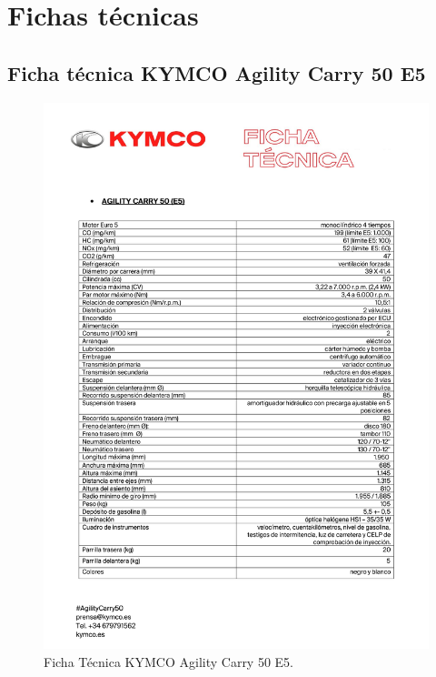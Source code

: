 \section{Fichas técnicas}
\label{anexo:ficha tecnica}

\subsection{Ficha técnica KYMCO Agility Carry 50 E5}
\label{subanexo: ficha tecnica kymco 50}

\begin{figure}[H]
    \centering
    \includegraphics[scale = 0.7]{archivos/ficha_tecnica_motillo_peter.pdf}
    \caption{Ficha Técnica KYMCO Agility Carry 50 E5.}
    \label{fig: ficha tecnica KYMCO 50}
\end{figure}



